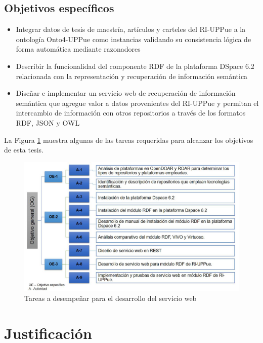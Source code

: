 \subsection{Objetivos espec\'ificos}

\begin{itemize}
     \item  Integrar datos de tesis de maestr\'ia, art\'iculos y carteles del RI-UPPue a la ontolog\'ia Onto4-UPPue como instancias validando su consistencia l\'ogica de forma autom\'atica mediante razonadores

     \item Describir la funcionalidad del componente RDF de la plataforma DSpace 6.2 relacionada con la representación y recuperación de información semántica
     
     \item Dise\~{n}ar e implementar un servicio web de recuperación de información semántica que agregue valor a datos provenientes del RI-UPPue y permitan el intercambio de información con otros repositorios a través de los formatos RDF, JSON y OWL
   \end{itemize}
   
   
La Figura \ref{actividades_objetivos} muestra algunas de las tareas requeridas para alcanzar los objetivos de esta tesis. 

\begin{figure}[!ht]
    \centering
    \includegraphics[width=12cm]{figures/actividades-2019.jpg} %
    \caption{Tareas a desempe\~{n}ar para el desarrollo del servicio web} %
    \label{actividades_objetivos}
\end{figure}

\section{Justificaci\'on}

